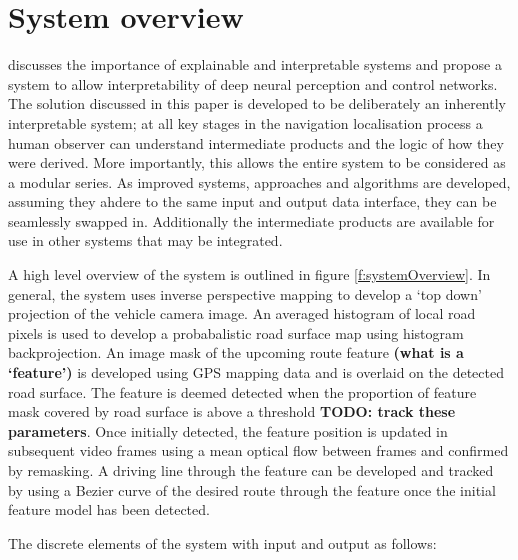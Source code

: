 \documentclass[]{aiaa-tc}%
\begin{document}
\section{System overview}
\citep{explainableCNNBookChapter} discusses the importance of explainable and interpretable systems and propose a system to allow interpretability of deep neural perception and control networks. The solution discussed in this paper is developed to be deliberately an inherently interpretable system; at all key stages in the navigation localisation process a human observer can understand intermediate products and the logic of how they were derived. 
More importantly, this allows the entire system to be considered as a modular series. As improved systems, approaches and algorithms are developed, assuming they ahdere to the same input and output data interface, they can be seamlessly swapped in. Additionally the intermediate products are available for use in other systems that may be integrated.

A high level overview of the system is outlined in figure \ref{f:systemOverview}. In general, the system uses inverse perspective mapping to develop a `top down' projection of the vehicle camera image. An averaged histogram of local road pixels is used to develop a probabalistic road surface map using histogram backprojection. An image mask of the upcoming route feature \textbf{(what is a `feature')} is developed using GPS mapping data and is overlaid on the detected road surface. The feature is deemed detected when the proportion of feature mask covered by road surface is above a threshold \textbf{TODO: track these parameters}. Once initially detected, the feature position is updated in subsequent video frames using a mean optical flow between frames and confirmed by remasking. A driving line through the feature can be developed and tracked by using a Bezier curve of the desired route through the feature once the initial feature model has been detected.

The discrete elements of the system with input and output as follows:
\end{document}
